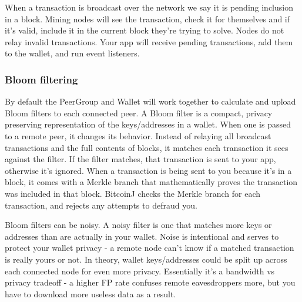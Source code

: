 \documentclass[a4paper,12pt]{article}
\begin{document}
When a transaction is broadcast over the network we say it is pending inclusion in a block. Mining nodes will see the transaction, check it for themselves and if it's valid, include it in the current block they're trying to solve. Nodes do not relay invalid transactions. Your app will receive pending transactions, add them to the wallet, and run event listeners. 

\subsubsection{Bloom filtering}
By default the PeerGroup and Wallet will work together to calculate and upload Bloom filters to each connected peer. A Bloom filter is a compact, privacy preserving representation of the keys/addresses in a wallet. When one is passed to a remote peer, it changes its behavior. Instead of relaying all broadcast transactions and the full contents of blocks, it matches each transaction it sees against the filter. If the filter matches, that transaction is sent to your app, otherwise it's ignored. When a transaction is being sent to you because it's in a block, it comes with a Merkle branch that mathematically proves the transaction was included in that block. BitcoinJ checks the Merkle branch for each transaction, and rejects any attempts to defraud you.

Bloom filters can be noisy. A noisy filter is one that matches more keys or addresses than are actually in your wallet. Noise is intentional and serves to protect your wallet privacy - a remote node can't know if a matched transaction is really yours or not. In theory, wallet keys/addresses could be split up across each connected node for even more privacy. Essentially it's a bandwidth vs privacy tradeoff - a higher FP rate confuses remote eavesdroppers more, but you have to download more useless data as a result.

\end{document}
